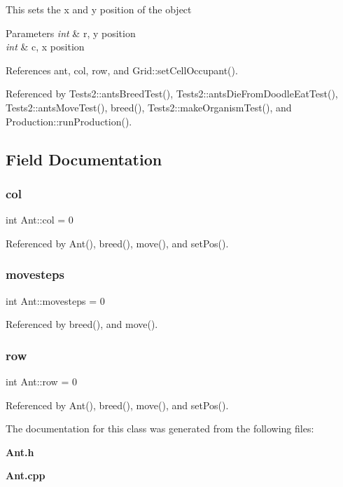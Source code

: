 This sets the x and y position of the object 
\begin{DoxyParams}{Parameters}
{\em int} & r, y position \\
\hline
{\em int} & c, x position \\
\hline
\end{DoxyParams}


References ant, col, row, and Grid\+::set\+Cell\+Occupant().



Referenced by Tests2\+::ants\+Breed\+Test(), Tests2\+::ants\+Die\+From\+Doodle\+Eat\+Test(), Tests2\+::ants\+Move\+Test(), breed(), Tests2\+::make\+Organism\+Test(), and Production\+::run\+Production().



\subsection{Field Documentation}
\mbox{\label{classAnt_afe21bedec87ea26e3db74857960a78c6}} 
\subsubsection{col}
{\footnotesize\ttfamily int Ant\+::col = 0\hspace{0.3cm}{\ttfamily [private]}}



Referenced by Ant(), breed(), move(), and set\+Pos().

\mbox{\label{classAnt_a15f73cd5012242c89bc2ce5608adde3c}} 
\subsubsection{movesteps}
{\footnotesize\ttfamily int Ant\+::movesteps = 0\hspace{0.3cm}{\ttfamily [private]}}



Referenced by breed(), and move().

\mbox{\label{classAnt_abf712c4a02e999938c7d79557a8fc24b}} 
\subsubsection{row}
{\footnotesize\ttfamily int Ant\+::row = 0\hspace{0.3cm}{\ttfamily [private]}}



Referenced by Ant(), breed(), move(), and set\+Pos().



The documentation for this class was generated from the following files\+:\begin{DoxyCompactItemize}
\item 
\textbf{ Ant.\+h}\item 
\textbf{ Ant.\+cpp}\end{DoxyCompactItemize}
